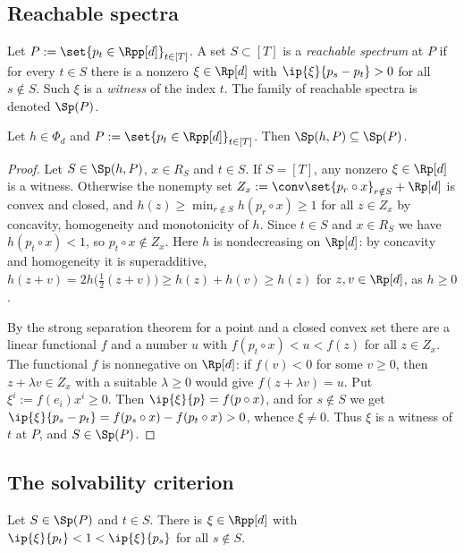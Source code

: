 \subsection{Reachable spectra}

\begin{definition}\label{def:reachable}
Let $P:=\set{p_t\in\Rpp[d]}_{t\in[T]}$. A set $S\subset[T]$ is a \emph{reachable spectrum} at $P$ if for every $t\in S$ there is a nonzero $\xi\in\Rp[d]$ with $\ip{\xi}{p_s-p_t}>0$ for all $s\notin S$. Such $\xi$ is a \emph{witness} of the index $t$. The family of reachable spectra is denoted $\Sp(P)$.
\end{definition}

\begin{lemma}[necessity]\label{lem:necessity}
Let $h\in\Phi_d$ and $P:=\set{p_t\in\Rpp[d]}_{t\in[T]}$. Then $\Sp(h,P)\subseteq\Sp(P)$.
\end{lemma}

\begin{proof}
Let $S\in\Sp(h,P)$, $x\in R_S$ and $t\in S$. If $S=[T]$, any nonzero $\xi\in\Rp[d]$ is a witness. Otherwise the nonempty set $Z_x:=\conv\set{p_r\circ x}_{r\notin S}+\Rp[d]$ is convex and closed, and $h(z)\ge\min_{r\notin S}h(p_r\circ x)\ge1$ for all $z\in Z_x$ by concavity, homogeneity and monotonicity of $h$. Since $t\in S$ and $x\in R_S$ we have $h(p_t\circ x)<1$, so $p_t\circ x\notin Z_x$. Here $h$ is nondecreasing on $\Rp[d]$: by concavity and homogeneity it is superadditive, $h(z+v)=2h\bigl(\tfrac12(z+v)\bigr)\ge h(z)+h(v)\ge h(z)$ for $z,v\in\Rp[d]$, as $h\ge0$.

By the strong separation theorem for a point and a closed convex set \citep[Thm.~11.4]{Rockafellar1970} there are a linear functional $f$ and a number $u$ with $f(p_t\circ x)<u<f(z)$ for all $z\in Z_x$. The functional $f$ is nonnegative on $\Rp[d]$: if $f(v)<0$ for some $v\ge0$, then $z+\lambda v\in Z_x$ with a suitable $\lambda\ge0$ would give $f(z+\lambda v)=u$. Put $\xi^i:=f(e_i)x^i\ge0$. Then $\ip{\xi}{p}=f(p\circ x)$, and for $s\notin S$ we get $\ip{\xi}{p_s-p_t}=f(p_s\circ x)-f(p_t\circ x)>0$, whence $\xi\ne0$. Thus $\xi$ is a witness of $t$ at $P$, and $S\in\Sp(P)$.
\end{proof}

\subsection{The solvability criterion}

\begin{lemma}[separation]\label{lem:separation}
Let $S\in\Sp(P)$ and $t\in S$. There is $\xi\in\Rpp[d]$ with $\ip{\xi}{p_t}<1<\ip{\xi}{p_s}$ for all $s\notin S$.
\end{lemma}

